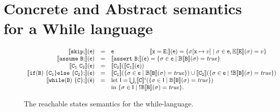 \documentclass{llncs}
\newcommand{\sopra}{\vspace{-.3cm}}
\begin{document}
\sopra
\section{Concrete and Abstract semantics for a While language}

\begin{figure}[t]
\[
\begin{array}{rcl}
\sem{\code{skip};}(\el{e}) & = & \el{e} \qquad \qquad \qquad
\sem{\code{x = E};}(\el{e})  = \{ \sigma[\code{x} \mapsto v] \mid \sigma \in \el{e}, \semantica{E}{\code{E}}(\sigma) = v \}    \\
\sem{\code{assume}\ \code{B};}(\el{e}) &=& \sem{\code{assert}\ \code{B};}(\el{e}) = \{ \sigma \in \el{e} \mid \semantica{B}{\code{B}}(\sigma) = \mathit{true} \} \\
\sem{\code{C_1\ C_2}}(\el{e}) & = & \sem{\code{C_2}}(\sem{\code{C_1}}(\el{e})) \\
\sem{ \If(\code{B})~ \{ \code{C}_1 \} \Else~\{ \code{C}_2 \};}(\el{e}) & = & \sem{\code{C_1}}( \{ \sigma \in \el{e} \mid \semantica{B}{\code{B}}(\sigma) = \mathit{true} \}) \cup \sem{\code{C_2}}( \{ \sigma \in \el{e} \mid \semantica{!B}{\code{B}}(\sigma) = \mathit{true} \}) \\
\sem{\While(\code{B})~\{\code{C}\};}(\ael{e}) & = & \mathrm{let}\ \el{I} =  \bigcup_{i} \sem{C}^{i}(\{ \sigma \in \el{I} \mid \semantica{B}{B}(\sigma) = \mathit{true}\})\\ 
& & \mathrm{in}\ \{ \sigma \in \el{I} \mid \semantica{!B}{B}(\sigma) = \mathit{true}\}.
\end{array}
\]
\caption{The  reachable states semantics for the while-language.}
\label{fig:WhileLanguageCSemantics}
\sopra
\end{figure}
\end{document}
